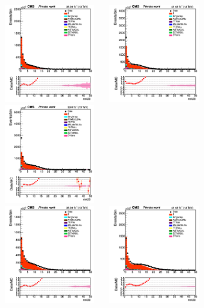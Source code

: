 \documentclass{cernatlasnote}
\begin{document}
  \begin{figure}[htp]
\centering
\includegraphics[width=4.6cm, height=4.4cm]{images/emu_channel/2016/16_Range_0pt2_1pt8/track_ntrk20_TRK_Linear.png}
\includegraphics[width=4.6cm, height=4.4cm]{images/emu_channel/2017/17_Range_0pt2_1pt8/track_ntrk20_TRK_Linear.png}
 \includegraphics[width=4.6cm, height=4.4cm]{images/emu_channel/2018/18_Range_0pt2_1pt8/track_ntrk20_TRK_Linear.png}\\
 \includegraphics[width=4.6cm, height=4.4cm]{images/emu_channel/2016/16_Range_0pt2_1pt8/track_ntrk30_TRK_Linear.png}
\includegraphics[width=4.6cm, height=4.4cm]{images/emu_channel/2017/17_Range_0pt2_1pt8/track_ntrk30_TRK_Linear.png}

\end{figure}
\end{document}
